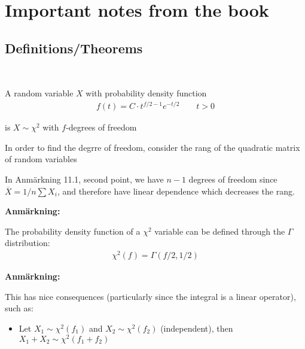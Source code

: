 \section{Important notes from the book}\par
\subsection{Definitions/Theorems}\hfill\\
\par\bigskip
\begin{theo}{}
  A random variable $X$ with probability density function
  \begin{equation*}
    \begin{gathered}
      f(t) = C\cdot t^{f/2-1}e^{-t/2}\qquad t>0
    \end{gathered}
  \end{equation*}
  \par\bigskip
  \noindent is $X\sim \chi^2$ with $f$-degrees of freedom
  \noindent
\end{theo}
\par\bigskip
\begin{lem}{}
  In order to find the degrre of freedom, consider the rang of the quadratic matrix of random variables
  \par\bigskip
  \noindent In Anmärkning 11.1, second point, we have $n-1$ degrees of freedom since $\overline{X} = 1/n\sum X_i$, and therefore have linear dependence which decreases the rang.
\end{lem}
\par\bigskip
\noindent\textbf{Anmärkning:}\par
\noindent The probability density function of a $\chi^2$ variable can be defined through the $\Gamma$ distribution:
\begin{equation*}
  \begin{gathered}
    \chi^2(f) = \Gamma(f/2,1/2)
  \end{gathered}
\end{equation*}
\par\bigskip
\noindent\textbf{Anmärkning:}\par
\noindent This has nice consequences (particularly since the integral is a linear operator), such as:\par
\begin{itemize}
  \item Let $X_1\sim\chi^2(f_1)$ and $X_2\sim\chi^2(f_2)$ (independent), then $X_1+X_2\sim\chi^2(f_1+f_2)$
\end{itemize}
